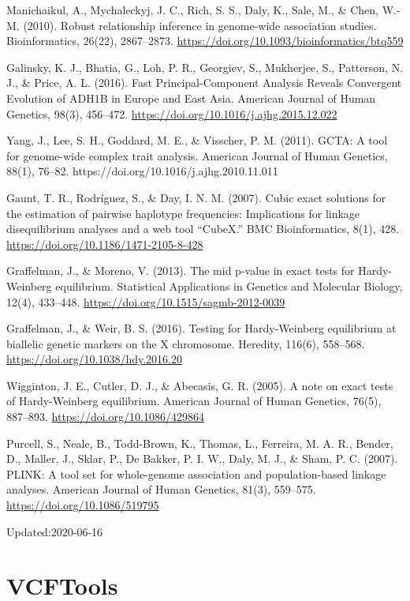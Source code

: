 \documentclass[]{article}
\begin{document}
Manichaikul, A., Mychaleckyj, J. C., Rich, S. S., Daly, K., Sale, M., \& Chen, W.-M. (2010). Robust relationship inference in genome-wide association studies. Bioinformatics, 26(22), 2867–2873. \url{https://doi.org/10.1093/bioinformatics/btq559}

Galinsky, K. J., Bhatia, G., Loh, P. R., Georgiev, S., Mukherjee, S., Patterson, N. J., \& Price, A. L. (2016). Fast Principal-Component Analysis Reveals Convergent Evolution of ADH1B in Europe and East Asia. American Journal of Human Genetics, 98(3), 456–472. \url{https://doi.org/10.1016/j.ajhg.2015.12.022}

Yang, J., Lee, S. H., Goddard, M. E., \& Visscher, P. M. (2011). GCTA: A tool for genome-wide complex trait analysis. American Journal of Human Genetics, 88(1), 76–82. {https://doi.org/10.1016/j.ajhg.2010.11.011}

Gaunt, T. R., Rodríguez, S., \& Day, I. N. M. (2007). Cubic exact solutions for the estimation of pairwise haplotype frequencies: Implications for linkage disequilibrium analyses and a web tool “CubeX.” BMC Bioinformatics, 8(1), 428. \url{https://doi.org/10.1186/1471-2105-8-428}

Graffelman, J., \& Moreno, V. (2013). The mid p-value in exact tests for Hardy-Weinberg equilibrium. Statistical Applications in Genetics and Molecular Biology, 12(4), 433–448. \url{https://doi.org/10.1515/sagmb-2012-0039}

Graffelman, J., \& Weir, B. S. (2016). Testing for Hardy-Weinberg equilibrium at biallelic genetic markers on the X chromosome. Heredity, 116(6), 558–568. \url{https://doi.org/10.1038/hdy.2016.20}

Wigginton, J. E., Cutler, D. J., \& Abecasis, G. R. (2005). A note on exact tests of Hardy-Weinberg equilibrium. American Journal of Human Genetics, 76(5), 887–893. \url{https://doi.org/10.1086/429864}

Purcell, S., Neale, B., Todd-Brown, K., Thomas, L., Ferreira, M. A. R., Bender, D., Maller, J., Sklar, P., De Bakker, P. I. W., Daly, M. J., \& Sham, P. C. (2007). PLINK: A tool set for whole-genome association and population-based linkage analyses. American Journal of Human Genetics, 81(3), 559–575. \url{https://doi.org/10.1086/519795}

Updated:2020-06-16

\section{VCFTools}
\end{document}
